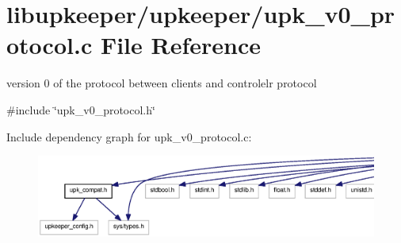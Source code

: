 \section{libupkeeper/upkeeper/upk\_\-v0\_\-protocol.c File Reference}
\label{upk__v0__protocol_8c}


version 0 of the protocol between clients and controlelr  protocol  


{\ttfamily \#include \char`\"{}upk\_\-v0\_\-protocol.h\char`\"{}}\par
Include dependency graph for upk\_\-v0\_\-protocol.c:\nopagebreak
\begin{figure}[H]
\begin{center}
\leavevmode
\includegraphics[width=400pt]{upk__v0__protocol_8c__incl}
\end{center}
\end{figure}
